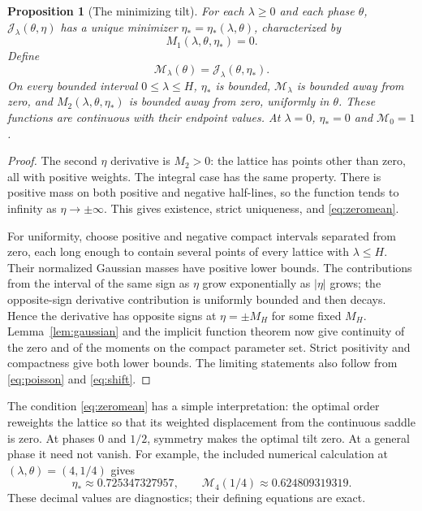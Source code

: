 \documentclass[11pt,a4paper]{article}
\numberwithin{equation}{section}
\newtheorem{proposition}[theorem]{Proposition}
\theoremstyle{definition}\newtheorem{definition}[theorem]{Definition}
\theoremstyle{remark}\newtheorem{remark}[theorem]{Remark}
\newcommand{\calJ}{\mathcal J}
\newcommand{\calM}{\mathcal M}
\begin{document}
\begin{proposition}[The minimizing tilt]
\label{prop:tilt}
For each $\lambda\ge0$ and each phase $\theta$, $\calJ_\lambda(\theta,\eta)$
has a unique minimizer $\eta_*=\eta_*(\lambda,\theta)$, characterized by
\begin{equation}
 M_1(\lambda,\theta,\eta_*)=0.
 \label{eq:zeromean}
\end{equation}
Define
\begin{equation}
 \calM_\lambda(\theta)=\calJ_\lambda(\theta,\eta_*).
 \label{eq:Mprofile}
\end{equation}
On every bounded interval $0\le\lambda\le H$, $\eta_*$ is bounded,
$\calM_\lambda$ is bounded away from zero, and
$M_2(\lambda,\theta,\eta_*)$ is bounded away from zero, uniformly in
$\theta$. These functions are continuous with their endpoint values.
At $\lambda=0$, $\eta_*=0$ and $\calM_0=1$.
\end{proposition}
\begin{proof}
The second $\eta$ derivative is $M_2>0$: the lattice has points other than
zero, all with positive weights. The integral case has the same property.
There is positive mass on both positive and negative half-lines, so the
function tends to infinity as $\eta\to\pm\infty$. This gives existence,
strict uniqueness, and \eqref{eq:zeromean}.

For uniformity, choose positive and negative compact intervals separated
from zero, each long enough to contain several points of every lattice
with $\lambda\le H$. Their normalized Gaussian masses have positive lower
bounds. The contributions from the interval of the same sign as $\eta$
grow exponentially as $|\eta|$ grows; the opposite-sign derivative
contribution is uniformly bounded and then decays. Hence the derivative
has opposite signs at $\eta=\pm M_H$ for some fixed $M_H$. Lemma~\ref{lem:gaussian}
and the implicit function theorem now give continuity of the zero and
of the moments on the compact parameter set. Strict positivity and
compactness give both lower bounds. The limiting statements also follow
from \eqref{eq:poisson} and \eqref{eq:shift}.
\end{proof}

The condition \eqref{eq:zeromean} has a simple interpretation: the optimal
order reweights the lattice so that its weighted displacement from the
continuous saddle is zero. At phases $0$ and $1/2$, symmetry makes the
optimal tilt zero. At a general phase it need not vanish. For example,
the included numerical calculation at $(\lambda,\theta)=(4,1/4)$ gives
\begin{equation}
 \eta_*\approx0.725347327957,\qquad
 \calM_4(1/4)\approx0.624809319319.
 \label{eq:example-tilt}
\end{equation}
These decimal values are diagnostics; their defining equations are exact.
\end{document}
